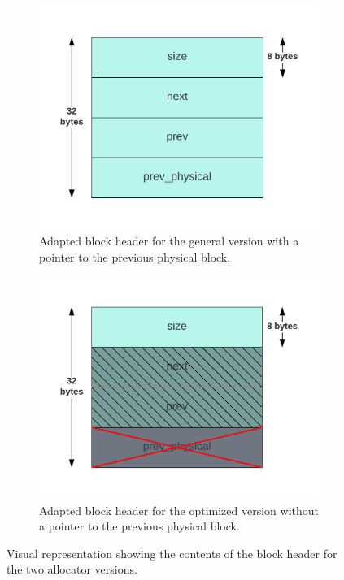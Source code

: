 \begin{figure}[H]
    \centering
    \begin{subfigure}[b]{0.49\textwidth}
        \centering
        \includegraphics[width=\textwidth]{figures/blockheader_large.png}
        \caption{Adapted block header for the general version with a pointer to the previous physical block.}
        \label{fig:blockheader_large}
    \end{subfigure}
    \hfill
    \begin{subfigure}[b]{0.49\textwidth}
        \centering
        \includegraphics[width=\textwidth]{figures/blockheader_small.png}
        \caption{Adapted block header for the optimized version without a pointer to the previous physical block.}
        \label{fig:blockheader_small}
    \end{subfigure}
    \caption{Visual representation showing the contents of the block header for the two allocator versions.}
    \label{fig:blockheader_adaptations}
\end{figure}

